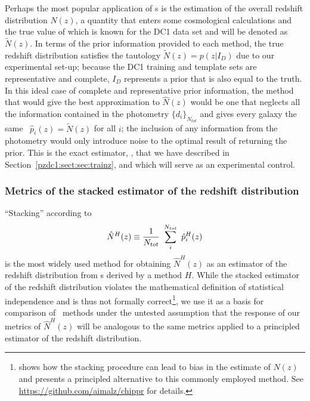 Perhaps the most popular application of \pzpdf s is the estimation of the overall redshift distribution $N(z)$, a quantity that enters some cosmological calculations and the true value of which is known for the DC1 data set and will be denoted as $\tilde{N}(z)$.
In terms of the prior information provided to each method, the true redshift distribution satisfies the tautology $\tilde{N}(z) = p(z \vert I_{D})$ due to our experimental set-up; 
because the DC1 training and template sets are representative and complete, $I_{D}$ represents a prior that is also equal to the truth.
In this ideal case of complete and representative prior information, the method that would give the best approximation to $\hat{N}(z)$ would be one that neglects all the information contained in the photometry $\{d_{i}\}_{N_{tot}}$ and gives every galaxy the same \pzpdf\ $\hat{p}_{i}(z) = \tilde{N}(z)$ for all $i$; 
the inclusion of any information from the photometry would only introduce noise to the optimal result of returning the prior.
This is the exact estimator, \trainz, that we have described in Section~\ref{pzdc1:sect:sec:trainz}, and which will serve as an experimental control.

\subsubsection{Metrics of the stacked estimator of the redshift distribution}
\label{sec:stackedmetrics}

``Stacking'' according to
\begin{equation}
\eqlabel{eq:stacked}
\hat{N}^{H}(z) \equiv \frac{1}{N_{tot}}\ \sum_{i}^{N_{tot}}\ \hat{p}^{H}_{i}(z)
\end{equation}
is the most widely used method for obtaining $\hat{N}^{H}(z)$ as an estimator of the redshift distribution from \pzpdf s derived by a method $H$.
While the stacked estimator of the redshift distribution violates the mathematical definition of statistical independence and is thus not formally correct\footnote{ shows how the stacking procedure can lead to bias in the estimate of $N(z)$ and presents a principled alternative to this commonly employed method.  See \url{https://github.com/aimalz/chippr} for details.}, we use it as a basis for comparison of \pzpdf\ methods under the untested assumption that the response of our metrics of $\hat{N}^{H}(z)$ will be analogous to the same metrics applied to a principled estimator of the redshift distribution.

